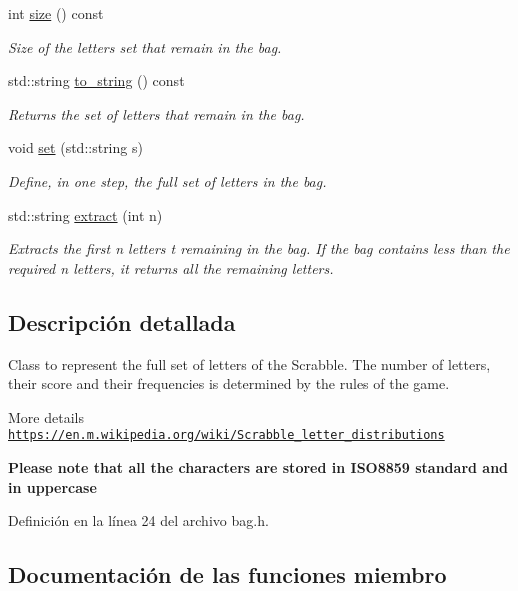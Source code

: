 \begin{DoxyCompactItemize}
int \hyperlink{classBag_a32652be363a0f5d189b029ed863e5bf2}{size} () const
\begin{DoxyCompactList}\small\item\em Size of the letters set that remain in the bag. \end{DoxyCompactList}\item 
std\+::string \hyperlink{classBag_ac63bdc8c3ceed6d86db66b9d399764ab}{to\+\_\+string} () const
\begin{DoxyCompactList}\small\item\em Returns the set of letters that remain in the bag. \end{DoxyCompactList}\item 
void \hyperlink{classBag_a3de5aa1629a7fdd40630d140adde2757}{set} (std\+::string s)
\begin{DoxyCompactList}\small\item\em Define, in one step, the full set of letters in the bag. \end{DoxyCompactList}\item 
std\+::string \hyperlink{classBag_ac75abe2b7626e50109a1add3382978af}{extract} (int n)
\begin{DoxyCompactList}\small\item\em Extracts the first {\ttfamily n} letters t remaining in the bag. If the bag contains less than the required {\ttfamily n} letters, it returns all the remaining letters. \end{DoxyCompactList}\end{DoxyCompactItemize}


\subsection{Descripción detallada}
Class to represent the full set of letters of the Scrabble. The number of letters, their score and their frequencies is determined by the rules of the game. 

More details \href{https://en.m.wikipedia.org/wiki/Scrabble_letter_distributions}{\tt https\+://en.\+m.\+wikipedia.\+org/wiki/\+Scrabble\+\_\+letter\+\_\+distributions}

{\bfseries Please note that all the characters are stored in I\+S\+O8859 standard and in uppercase} 

Definición en la línea 24 del archivo bag.\+h.



\subsection{Documentación de las funciones miembro}
\mbox{\label{classBag_ad380d36f2628b3ffe0ca19cfe53d7c19}} 
